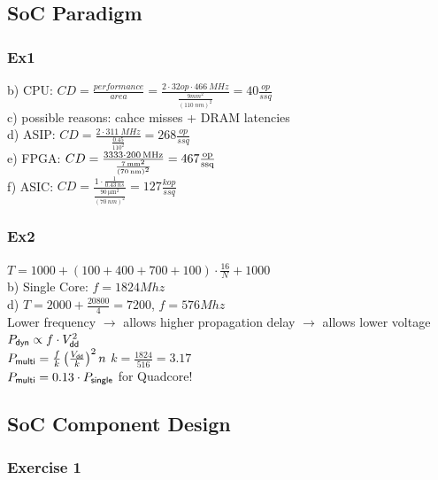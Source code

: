 \begin{sectionbox}
	\subsection{SoC Paradigm}

		\subsubsection{Ex1}
			b) CPU: $CD = \frac{performance}{area} = \frac{2 \cdot 32 op \cdot \SI{466}{MHz}}{\frac{9mm^2}{(\SI{110}{nm})^2}} = 40 \frac{\si{op}}{\si{s sq}}$\\
			c) possible reasons: cahce misses + DRAM latencies\\
			d) ASIP: $CD = \frac{2 \cdot \SI{311}{MHz}}{\frac{0.45}{110^2}} = 268 \frac{\si{op}}{\si{s sq}}$\\
			e) FPGA: $CD = \frac{3333 \cdot \SI{200}{MHz}}{\frac{\SI{7}{mm\squared}}{(\SI{70}{nm})^2}} = 467 \frac{\si{op}}{\si{s sq}}$\\
			f) ASIC: $CD = \frac{1 \cdot \frac{1}{\SI{0.43}{ns}}}{\frac{\SI{90}{\micro\meter\squared}}{(\SI{70}{nm})^2}} = 127 \frac{\si{kop}}{\si{s sq}}$\\

		\subsubsection{Ex2}
		$T = 1000 + (100+400+700+100)\cdot\frac{16}{N} + 1000$\\
		b) Single Core: $f=1824 Mhz$\\
		d) $T=2000+\frac{20800}{4} = 7200$, $f=576 Mhz$\\

		Lower frequency $\to$ allows higher propagation delay $\to$ allows lower voltage\\
		$P_{\sf dyn} \propto f \cdot V_{\sf dd}^2$\\
		$P_{\sf multi} = \frac{f}{k} \left( \frac{V_{\sf dd}}{k} \right)^2 n$ \qquad $k = \frac{1824}{516} = 3.17$\\ 
		$P_{\sf multi} = 0.13 \cdot P_{\sf single}$ for Quadcore!\\ 
\end{sectionbox}



\begin{sectionbox}
	\subsection{SoC Component Design}

		\subsubsection{Exercise 1}
		

\end{sectionbox}



